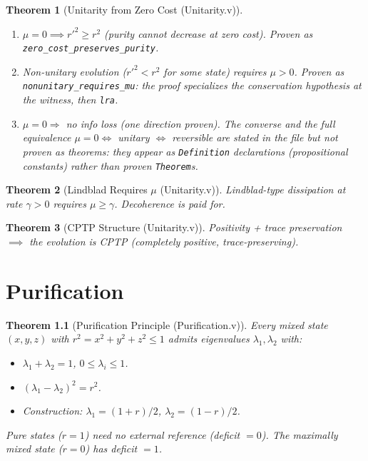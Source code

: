 \documentclass[11pt, a4paper]{report}
\theoremstyle{definition}
\theoremstyle{plain}
\newtheorem{theorem}{Theorem}[chapter]
\begin{document}
\begin{theorem}[Unitarity from Zero Cost {\normalfont (Unitarity.v)}]
\leavevmode
\begin{enumerate}
    \item $\mu = 0 \implies r'^2 \ge r^2$ (purity cannot decrease at zero cost). Proven as \texttt{zero\_cost\_preserves\_purity}.
    \item Non-unitary evolution ($r'^2 < r^2$ for some state) requires $\mu > 0$. Proven as \texttt{nonunitary\_requires\_mu}: the proof specializes the conservation hypothesis at the witness, then \texttt{lra}.
    \item $\mu = 0 \Rightarrow$ no info loss (one direction proven). The converse and the full equivalence $\mu = 0 \Leftrightarrow$ unitary $\Leftrightarrow$ reversible are \emph{stated} in the file but not proven as theorems: they appear as \texttt{Definition} declarations (propositional constants) rather than proven \texttt{Theorem}s.
\end{enumerate}
\end{theorem}

\begin{theorem}[Lindblad Requires $\mu$ {\normalfont (Unitarity.v)}]
Lindblad-type dissipation at rate $\gamma > 0$ requires $\mu \ge \gamma$. Decoherence is paid for.
\end{theorem}

\begin{theorem}[CPTP Structure {\normalfont (Unitarity.v)}]
Positivity + trace preservation $\implies$ the evolution is CPTP (completely positive, trace-preserving).
\end{theorem}

\chapter{Purification}

\begin{theorem}[Purification Principle {\normalfont (Purification.v)}]
Every mixed state $(x,y,z)$ with $r^2 = x^2+y^2+z^2 \le 1$ admits eigenvalues $\lambda_1, \lambda_2$ with:
\begin{itemize}
    \item $\lambda_1 + \lambda_2 = 1$, \quad $0 \le \lambda_i \le 1$.
    \item $(\lambda_1 - \lambda_2)^2 = r^2$.
    \item Construction: $\lambda_1 = (1 + r)/2$, $\lambda_2 = (1 - r)/2$.
\end{itemize}
Pure states ($r=1$) need no external reference (deficit $= 0$). The maximally mixed state ($r=0$) has deficit $= 1$.
\end{theorem}
\end{document}
